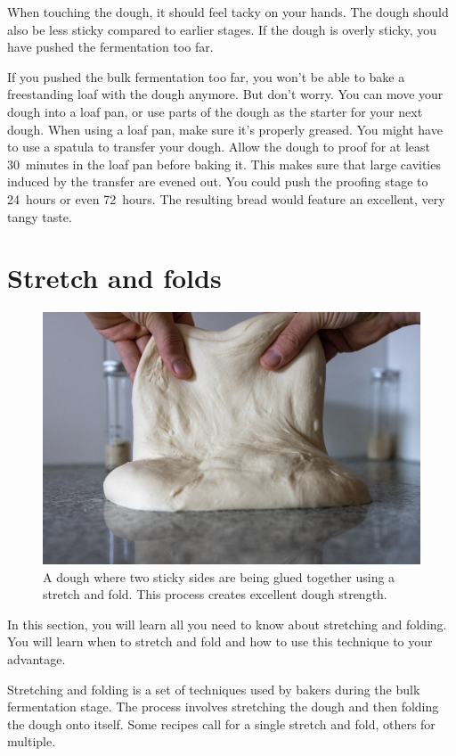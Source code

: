 When touching the dough, it should feel tacky
on your hands. The dough should also be less sticky
compared to earlier stages. If the dough is overly
sticky, you have pushed the fermentation too far.

If you pushed the bulk fermentation too far, you won't be able
to bake a freestanding loaf with the dough anymore. But don't
worry. You can move your dough into a loaf pan, or use parts
of the dough as the starter for your next dough. When using
a loaf pan, make sure it's properly greased. You might have
to use a spatula to transfer your dough. Allow the dough
to proof for at least 30~minutes in the loaf pan before
baking it. This makes sure that large cavities induced
by the transfer are evened out. You could push the proofing
stage to 24~hours or even 72~hours. The resulting
bread would feature an excellent, very tangy taste.


\section{Stretch and folds}

\begin{figure}[!htb]
  \includegraphics[width=\textwidth]{dough-being-glued}
  \caption[Gluing dough]{A dough where two sticky sides are being glued
      together using a stretch and fold. This process creates excellent dough
      strength.}
\end{figure}

In this section, you will learn all you need to know about stretching and
folding. You will learn when to stretch and fold and how to use this technique
to your advantage.

Stretching and folding is a set of techniques used by bakers during the bulk
fermentation stage. The process involves stretching the dough and then
folding the dough onto itself. Some recipes call for a single stretch
and fold, others for multiple.

